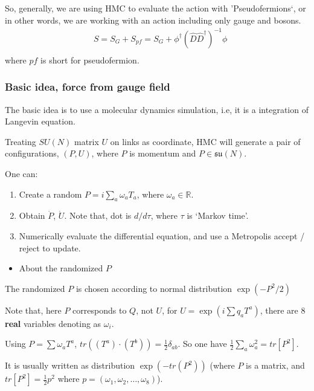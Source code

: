 So, generally, we are using HMC to evaluate the action with 'Pseudofermions`, or in other words, we are working with an action including only gauge and bosons.
\begin{equation}
\begin{split}
&S=S_G+S_{pf}=S_G+\phi ^{\dagger}\left(\hat{D}\hat{D}^{\dagger}\right)^{-1} \phi\\
\end{split}
\end{equation}
where $pf$ is short for pseudofermion.

\subsubsection{\label{sec:hmc_scheme}Basic idea, force from gauge field}

The basic idea is to use a molecular dynamics simulation, i.e, it is a integration of Langevin equation.

Treating $SU(N)$ matrix $U$ on links as coordinate, HMC will generate a pair of configurations, $(P,U)$, where $P$ is momentum and $P\in \mathfrak{su}(N)$.

One can:

\begin{enumerate}
  \item Create a random $P=i\sum _a\omega _a T_a$, where $\omega _a\in \mathbb{R}$.
  \item Obtain $\dot{P}$, $\dot{U}$. Note that, dot is $d/d\tau$, where $\tau$ is `Markov time'.
  \item Numerically evaluate the differential equation, and use a Metropolis accept / reject to update.
\end{enumerate}

\begin{itemize}
  \item About the randomized $P$
\end{itemize}

The randomized $P$ is chosen according to normal distribution $\exp \left(-P^2 /2\right)$

Note that, here $P$ corresponds to $Q$, not $U$, for $U=\exp\left(i \sum q_a T^a\right)$, there are $8$ \textbf{real} variables denoting as $\omega _i$.

Using $P=\sum \omega _a T^a$, $tr((T^a)\cdot (T^b))=\frac{1}{2}\delta _{ab}$. So one have $\frac{1}{2}\sum _a\omega _a^2=tr[P^2]$.

It is usually written as distribution $\exp \left(-tr(P^2)\right)$ (where $P$ is a matrix, and $tr[P^2]=\frac{1}{2}p^2$ where $p=(\omega_1,\omega_2,\ldots ,\omega _8)$).

